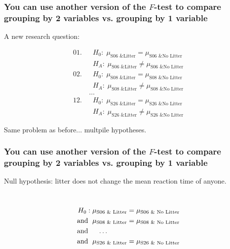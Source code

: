 \documentclass[slidestop,compress,mathserif,12pt,t,professionalfonts,xcolor=table]{beamer}
\newcommand{\ftest}{You can use another version of the $F$-test to compare grouping by 2 variables vs. grouping by 1 variable}
\begin{document}
\begin{frame}
  \frametitle{\ftest}

A new research question:


{\small
\begin{align*}
01.\ &  \; \; H_0: \; \mu_{\text{S06 \& Litter}} = \mu_{\text{S06 \& No Litter}} \\
     &  \; \; H_A: \; \mu_{\text{S06 \& Litter}} \neq \mu_{\text{S06 \& No Litter}} \\
02.\ &  \; \; H_0: \; \mu_{\text{S08 \& Litter}} = \mu_{\text{S08 \& No Litter}} \\
     &  \; \; H_A: \; \mu_{\text{S08 \& Litter}} \neq \mu_{\text{S08 \& No Litter}} \\
     & \ldots \\
12.\ &  \; \; H_0: \; \mu_{\text{S26 \& Litter}} = \mu_{\text{S26 \& No Litter}} \\
     &  \; \; H_A: \; \mu_{\text{S26 \& Litter}} \neq \mu_{\text{S26 \& No Litter}} 
\end{align*}
}

Same problem as before... multpile hypotheses.

\end{frame}


\begin{frame}
  \frametitle{\ftest}

Null hypothesis: litter does not change the mean reaction time of anyone.

\hfill \\


{\small
\begin{align*}
H_0: \; & \mu_{\text{S06 \& Litter}} = \mu_{\text{S06 \& No Litter}} \\
\textmd{and } \; & \mu_{\text{S08 \& Litter}} = \mu_{\text{S08 \& No Litter}} \\
\textmd{and } \; & \; \; \; \ldots \\
\textmd{and } \; & \mu_{\text{S26 \& Litter}} = \mu_{\text{S26 \& No Litter}} \\
\end{align*}
}

\end{frame}


\end{document}
